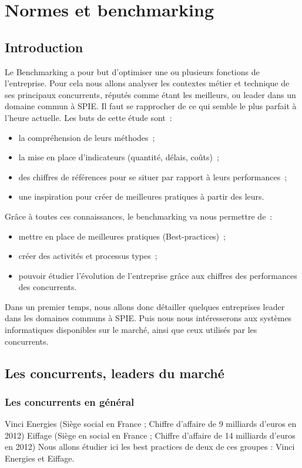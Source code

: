 \chapter{Normes et benchmarking}


\section{Introduction}
    	Le Benchmarking a pour but d'optimiser une ou plusieurs fonctions de l'entreprise. Pour cela nous allons analyser les contextes métier et technique de ses principaux concurrents, réputés comme étant les meilleurs, ou leader dans un domaine commun à SPIE. Il faut se rapprocher de ce qui semble le plus parfait à l'heure actuelle.
    	Les buts de cette étude sont~:
    \begin{itemize}
    	\item la compréhension de leurs méthodes~;
    	\item la mise en place d'indicateurs (quantité, délais, coûts)~;
    	\item des chiffres de références pour se situer par rapport à leurs performances~;
    	\item une inspiration pour créer de meilleures pratiques à partir des leurs.
    \end{itemize}
    \bigbreak
    	Grâce à toutes ces connaissances, le benchmarking va nous permettre de~:
    \begin{itemize}
    	\item mettre en place de meilleures pratiques (Best-practices)~;
    	\item créer des activités et processus types~;
    	\item pouvoir étudier l'évolution de l'entreprise grâce aux chiffres des performances des concurrents.
    \end{itemize}
    \bigbreak
    	Dans un premier temps, nous allons donc détailler quelques entreprises leader dans les domaines communs à SPIE. Puis nous nous intéresserons aux systèmes informatiques disponibles sur le marché, ainsi que ceux utilisés par les concurrents.

\section{Les concurrents, leaders du marché}

    \subsection{Les concurrents en général}
    Vinci Energies (Siège social en France ; Chiffre d'affaire de 9 milliards d’euros en 2012)
    Eiffage (Siège en social en France ; Chiffre d'affaire de 14 milliards d’euros en 2012)
    	Nous allons étudier ici les best practices de deux de ces groupes : Vinci Energies et Eiffage.

